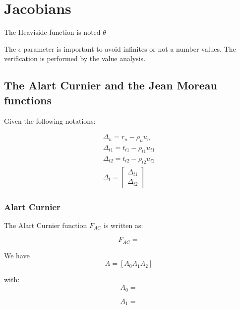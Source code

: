 \documentclass[a4paper]{article}
\begin{document}
\section{Jacobians}

The Heaviside function is noted $\theta$

The $\epsilon$ parameter is important to avoid infinites or not a number values. 
The verification is performed by the value analysis.

\subsection{The Alart Curnier and the Jean Moreau functions}

Given the following notations:

\begin{equation}
  \begin{array}{c}
    \Delta_n = r_n -\rho_n  u_n\\
    \Delta_{t1} = t_{t1} - \rho_{t1}  u_{t1}\\
    \Delta_{t2} = t_{t2} - \rho_{t2}  u_{t2}\\
    \Delta_{t} = \left [
      \begin{array}{c}
        \Delta_{t1}\\
        \Delta_{t2}
      \end{array} \right]
  \end{array}
\end{equation}

\subsubsection{Alart Curnier}

The Alart Curnier function $F_{AC}$ is written as:

\begin{equation}
  F_{AC} = 
\end{equation}

We have 
\begin{equation}
  A = \left[ A_0 A_1 A_2 \right]
\end{equation}

with:
\begin{equation}
  A_0 = 
\end{equation}

\begin{equation}
  A_1 = 
\end{equation}
\end{document}
